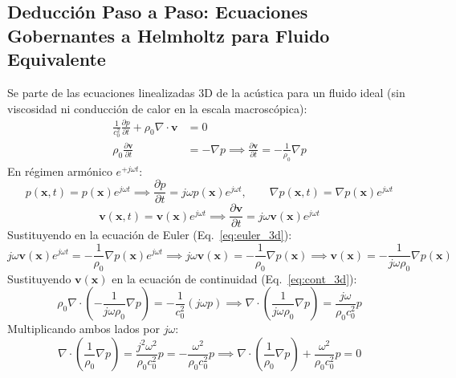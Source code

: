 \documentclass[11pt,a4paper]{article}
\begin{document}
\subsection{Deducción Paso a Paso: Ecuaciones Gobernantes a Helmholtz para Fluido Equivalente}
Se parte de las ecuaciones linealizadas 3D de la acústica para un fluido ideal (sin viscosidad ni conducción de calor en la escala macroscópica):
\begin{align}
\frac{1}{c_0^2} \frac{\partial p}{\partial t} + \rho_0 \nabla \cdot \mathbf{v} &= 0 \label{eq:cont_3d}\\
\rho_0 \frac{\partial \mathbf{v}}{\partial t} &= -\nabla p \implies \frac{\partial \mathbf{v}}{\partial t} = -\frac{1}{\rho_0} \nabla p \label{eq:euler_3d}
\end{align}
En régimen armónico $e^{+j\omega t}$:
\begin{equation}
p(\mathbf{x},t) = p(\mathbf{x}) e^{j\omega t} \implies \frac{\partial p}{\partial t} = j \omega p(\mathbf{x}) e^{j\omega t}, \qquad \nabla p(\mathbf{x},t) = \nabla p(\mathbf{x}) e^{j\omega t}
\end{equation}
\begin{equation}
\mathbf{v}(\mathbf{x},t) = \mathbf{v}(\mathbf{x}) e^{j\omega t} \implies \frac{\partial \mathbf{v}}{\partial t} = j \omega \mathbf{v}(\mathbf{x}) e^{j\omega t}
\end{equation}
Sustituyendo en la ecuación de Euler (Eq.~\ref{eq:euler_3d}):
\begin{equation}
j \omega \mathbf{v}(\mathbf{x}) e^{j\omega t} = -\frac{1}{\rho_0} \nabla p(\mathbf{x}) e^{j\omega t} \implies j \omega \mathbf{v}(\mathbf{x}) = -\frac{1}{\rho_0} \nabla p(\mathbf{x}) \implies \mathbf{v}(\mathbf{x}) = -\frac{1}{j \omega \rho_0} \nabla p(\mathbf{x})
\label{eq:v_gradp}
\end{equation}
Sustituyendo $\mathbf{v}(\mathbf{x})$ en la ecuación de continuidad (Eq.~\ref{eq:cont_3d}):
\begin{equation}
\rho_0 \nabla \cdot \left( -\frac{1}{j \omega \rho_0} \nabla p \right) = -\frac{1}{c_0^2} \left( j \omega p \right) \implies \nabla \cdot \left( \frac{1}{j \omega \rho_0} \nabla p \right) = \frac{j \omega}{\rho_0 c_0^2} p
\end{equation}
Multiplicando ambos lados por $j \omega$:
\begin{equation}
\nabla \cdot \left( \frac{1}{\rho_0} \nabla p \right) = \frac{j^2 \omega^2}{\rho_0 c_0^2} p = -\frac{\omega^2}{\rho_0 c_0^2} p \implies \nabla \cdot \left( \frac{1}{\rho_0} \nabla p \right) + \frac{\omega^2}{\rho_0 c_0^2} p = 0
\end{equation}
\end{document}
